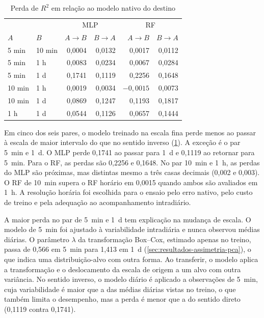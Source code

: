 \begin{table}[htbp]
    \centering
    \small
    \caption{Perda de $R^2$ em relação ao modelo nativo do destino}
    \label{tab:perdas-transferencia}
    \begin{tabular}{llrrrr}
        \toprule
        & & \multicolumn{2}{c}{MLP} & \multicolumn{2}{c}{RF} \\
        $A$ & $B$ & $A\to B$ & $B\to A$ & $A\to B$ & $B\to A$ \\
        \midrule
        5 min  & 10 min & 0,0004 & 0,0132 & 0,0017 & 0,0112 \\
        5 min  & 1 h    & 0,0083 & 0,0234 & 0,0067 & 0,0284 \\
        5 min  & 1 d    & 0,1741 & 0,1119 & 0,2256 & 0,1648 \\
        10 min & 1 h    & 0,0019 & 0,0034 & $-0,0015$ & 0,0073 \\
        10 min & 1 d    & 0,0869 & 0,1247 & 0,1193 & 0,1817 \\
        1 h    & 1 d    & 0,0544 & 0,1126 & 0,0657 & 0,1444 \\
        \bottomrule
    \end{tabular}
\end{table}

Em cinco dos seis pares, o modelo treinado na escala fina perde menos ao
passar à escala de maior intervalo do que no sentido inverso
(\cref{tab:perdas-transferencia}). A exceção é o par 5~min e 1~d. O MLP
perde 0,1741 ao passar para 1~d e 0,1119 ao retornar para 5~min. Para o RF,
as perdas são 0,2256 e 0,1648. No par 10~min e 1~h, as perdas do MLP são
próximas, mas distintas mesmo a três casas decimais (0,002 e 0,003). O RF de
10~min supera o RF horário em 0,0015 quando ambos são avaliados em 1~h. A
resolução horária foi escolhida para o ensaio pelo erro nativo, pelo custo
de treino e pela adequação ao acompanhamento intradiário.

A maior perda no par de 5~min e 1~d tem explicação na mudança de escala. O
modelo de 5~min foi ajustado à variabilidade intradiária e nunca observou
médias diárias. O parâmetro $\lambda$ da transformação Box--Cox, estimado
apenas no treino, passa de 0,566 em 5~min para 1,413 em 1~d
(\cref{sec:resultados-assimetria-pca}), o que indica uma distribuição-alvo
com outra forma. Ao transferir, o modelo aplica a transformação e o
deslocamento da escala de origem a um alvo com outra variância. No sentido
inverso, o modelo diário é aplicado a observações de 5~min, cuja
variabilidade é maior que a das médias diárias vistas no treino, o que
também limita o desempenho, mas a perda é menor que a do sentido direto
(0,1119 contra 0,1741).

